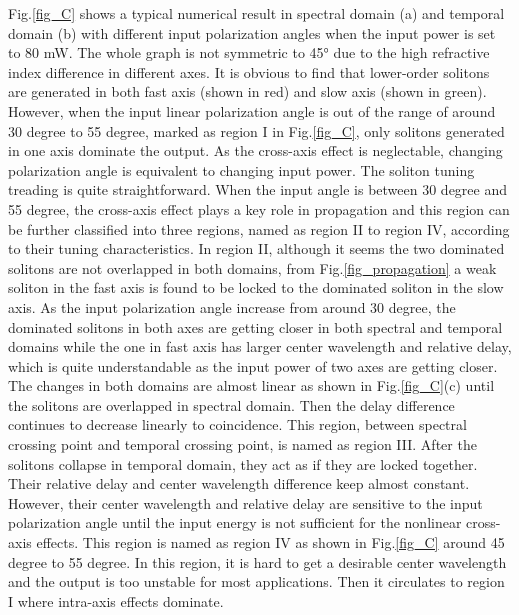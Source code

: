 \documentclass{osa-article}
\begin{document}
Fig.\ref{fig_C} shows a typical numerical result in spectral domain (a) and temporal domain (b) with different input polarization angles when the input power is set to 80 mW. The whole graph is not symmetric to 45° due to the high refractive index difference in different axes. It is obvious to find that lower-order solitons are generated in both fast axis (shown in red) and slow axis (shown in green). However, when the input linear polarization angle is out of the range of around 30 degree to 55 degree, marked as region I in Fig.\ref{fig_C}, only solitons generated in one axis dominate the output. As the cross-axis effect is neglectable, changing polarization angle is equivalent to changing input power. The soliton tuning treading is quite straightforward. When the input angle is between 30 degree and 55 degree, the cross-axis effect plays a key role in propagation and this region can be further classified into three regions, named as region II to region IV, according to their tuning characteristics. In region II, although it seems the two dominated solitons are not overlapped in both domains, from Fig.\ref{fig_propagation} a weak soliton in the fast axis is found to be locked to the dominated soliton in the slow axis. As the input polarization angle increase from around 30 degree, the dominated solitons in both axes are getting closer in both spectral and temporal domains while the one in fast axis has larger center wavelength and relative delay, which is quite understandable as the input power of two axes are getting closer. The changes in both domains are almost linear as shown in Fig.\ref{fig_C}(c) until the solitons are overlapped in spectral domain. Then the delay difference continues to decrease linearly to coincidence. This region, between spectral crossing point and temporal crossing point, is named as region III. After the solitons collapse in temporal domain, they act as if they are locked together. Their relative delay and center wavelength difference keep almost constant. However, their center wavelength and relative delay are sensitive to the input polarization angle until the input energy is not sufficient for the nonlinear cross-axis effects. This region is named as region IV as shown in Fig.\ref{fig_C} around 45 degree to 55 degree.  In this region, it is hard to get a desirable center wavelength and the output is too unstable for most applications. Then it circulates to region I where intra-axis effects dominate.
\end{document}
